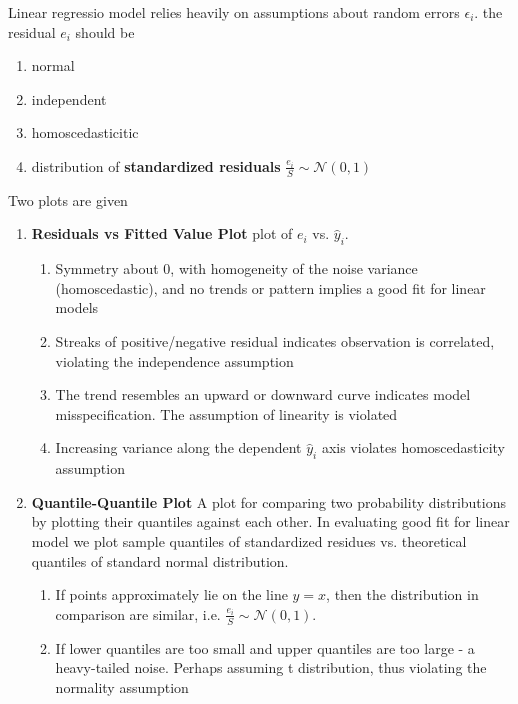 \documentclass[11pt]{article}
\begin{document}
\begin{defn*}
  Linear regressio model relies heavily on assumptions about random errors $\epsilon_i$. the residual $e_i$ should be
  \begin{enumerate}
    \item normal
    \item independent
    \item homoscedasticitic
    \item distribution of \textbf{standardized residuals} $\frac{e_i}{S} \sim \mathcal{N}(0,1)$
  \end{enumerate}
  Two plots are given
  \begin{enumerate}
    \item \textbf{Residuals vs Fitted Value Plot} plot of $e_i$ vs. $\hat{y}_i$.
      \begin{enumerate}
        \item Symmetry about 0, with homogeneity of the noise variance (homoscedastic), and no trends or pattern implies a good fit for linear models
        \item Streaks of positive/negative residual indicates observation is correlated, violating the independence assumption
        \item The trend resembles an upward or downward curve indicates model misspecification. The assumption of linearity is violated
        \item Increasing variance along the dependent $\hat{y}_i$ axis violates homoscedasticity assumption
      \end{enumerate}
    \item \textbf{Quantile-Quantile Plot} A plot for comparing two probability distributions by plotting their quantiles against each other. In evaluating good fit for linear model we plot sample quantiles of standardized residues vs. theoretical quantiles of standard normal distribution.
    \begin{enumerate}
      \item If points approximately lie on the line $y=x$, then the distribution in comparison are similar, i.e. $\frac{e_i}{S} \sim \mathcal{N}(0,1)$.
      \item If lower quantiles are too small and upper quantiles are too large - a heavy-tailed noise. Perhaps assuming t distribution, thus violating the normality assumption
    \end{enumerate}
  \end{enumerate}
\end{defn*}
\end{document}
